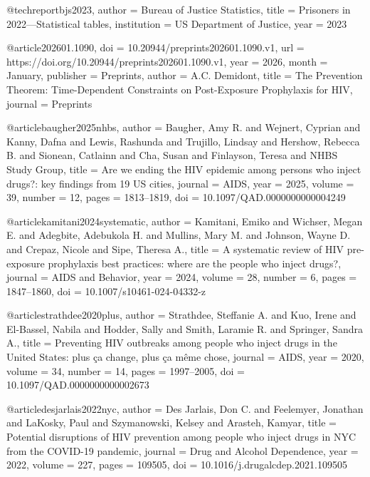 @techreport{bjs2023,
  author      = {{Bureau of Justice Statistics}},
  title       = {Prisoners in 2022---Statistical tables},
  institution = {US Department of Justice},
  year        = {2023}
}

@article{202601.1090,
	doi = {10.20944/preprints202601.1090.v1},
	url = {https://doi.org/10.20944/preprints202601.1090.v1},
	year = 2026,
	month = {January},
	publisher = {Preprints},
	author = {A.C. Demidont},
	title = {The Prevention Theorem: Time-Dependent Constraints on Post-Exposure Prophylaxis for HIV},
	journal = {Preprints}
}

@article{baugher2025nhbs,
  author  = {Baugher, Amy R. and Wejnert, Cyprian and Kanny, Dafna and Lewis, Rashunda and Trujillo, Lindsay and Hershow, Rebecca B. and Sionean, Catlainn and Cha, Susan and Finlayson, Teresa and {NHBS Study Group}},
  title   = {Are we ending the {HIV} epidemic among persons who inject drugs?: key findings from 19 {US} cities},
  journal = {AIDS},
  year    = {2025},
  volume  = {39},
  number  = {12},
  pages   = {1813--1819},
  doi     = {10.1097/QAD.0000000000004249}
}

@article{kamitani2024systematic,
  author  = {Kamitani, Emiko and Wichser, Megan E. and Adegbite, Adebukola H. and Mullins, Mary M. and Johnson, Wayne D. and Crepaz, Nicole and Sipe, Theresa A.},
  title   = {A systematic review of {HIV} pre-exposure prophylaxis best practices: where are the people who inject drugs?},
  journal = {AIDS and Behavior},
  year    = {2024},
  volume  = {28},
  number  = {6},
  pages   = {1847--1860},
  doi     = {10.1007/s10461-024-04332-z}
}

@article{strathdee2020plus,
  author  = {Strathdee, Steffanie A. and Kuo, Irene and El-Bassel, Nabila and Hodder, Sally and Smith, Laramie R. and Springer, Sandra A.},
  title   = {Preventing {HIV} outbreaks among people who inject drugs in the {United States}: plus {\c{c}}a change, plus {\c{c}}a m{\^e}me chose},
  journal = {AIDS},
  year    = {2020},
  volume  = {34},
  number  = {14},
  pages   = {1997--2005},
  doi     = {10.1097/QAD.0000000000002673}
}

@article{desjarlais2022nyc,
  author  = {Des Jarlais, Don C. and Feelemyer, Jonathan and LaKosky, Paul and Szymanowski, Kelsey and Arasteh, Kamyar},
  title   = {Potential disruptions of {HIV} prevention among people who inject drugs in {NYC} from the {COVID-19} pandemic},
  journal = {Drug and Alcohol Dependence},
  year    = {2022},
  volume  = {227},
  pages   = {109505},
  doi     = {10.1016/j.drugalcdep.2021.109505}
}

